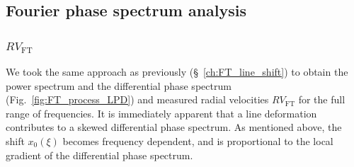 \subsection{Fourier phase spectrum analysis}

\subsubsection{$RV_\text{FT}$}
We took the same approach as previously (\S~\ref{ch:FT_line_shift}) to obtain the power spectrum and the differential phase spectrum (Fig.~\ref{fig:FT_process_LPD}) and measured radial velocities $RV_\text{FT}$ for the full range of frequencies. It is immediately apparent that a line deformation contributes to a skewed differential phase spectrum. As mentioned above, the shift $x_0(\xi)$ becomes frequency dependent, and is proportional to the local gradient of the differential phase spectrum. 

